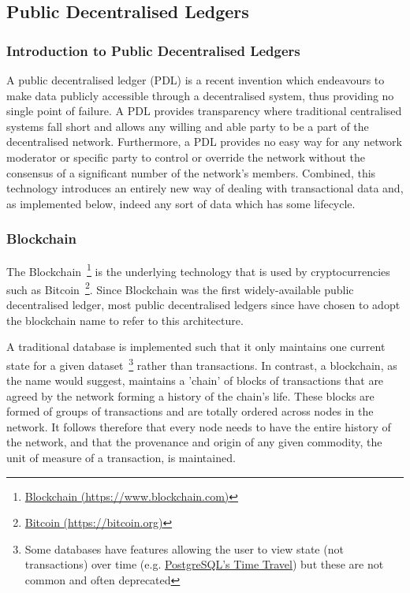\subsection{Public Decentralised Ledgers}

\subsubsection{Introduction to Public Decentralised Ledgers}

A public decentralised ledger (PDL) is a recent invention which endeavours to make data publicly accessible through a decentralised system, thus providing no single point of failure. A PDL provides transparency where traditional centralised systems fall short and allows any willing and able party to be a part of the decentralised network. Furthermore, a PDL provides no easy way for any network moderator or specific party to control or override the network without the consensus of a significant number of the network's members. Combined, this technology introduces an entirely new way of dealing with transactional data and, as implemented below, indeed any sort of data which has some lifecycle.


\subsubsection{Blockchain}

The Blockchain~\footnote{\href{https://www.blockchain.com/}{Blockchain (https://www.blockchain.com)}} is the underlying technology that is used by cryptocurrencies such as Bitcoin~\footnote{\href{https://bitcoin.org/en/}{Bitcoin (https://bitcoin.org)}}. Since Blockchain was the first widely-available public decentralised ledger, most public decentralised ledgers since have chosen to adopt the blockchain name to refer to this architecture.

A traditional database is implemented such that it only maintains one current state for a given dataset~\footnote{Some databases have features allowing the user to view state (not transactions) over time (e.g. \href{https://www.postgresql.org/docs/6.3/static/c0503.htm}{PostgreSQL's Time Travel}) but these are not common and often deprecated} rather than transactions. In contrast, a blockchain, as the name would suggest, maintains a 'chain' of blocks of transactions that are agreed by the network forming a history of the chain's life. These blocks are formed of groups of transactions and are totally ordered across nodes in the network. It follows therefore that every node needs to have the entire history of the network, and that the provenance and origin of any given commodity, the unit of measure of a transaction, is maintained.

